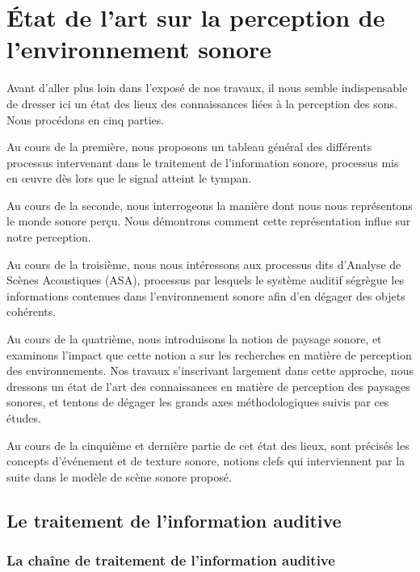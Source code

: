\chapter{État de l'art sur la perception de l'environnement sonore}\label{ch:psycho_ea}


Avant d'aller plus loin dans l'exposé de nos travaux, il nous semble indispensable de dresser ici un état des lieux des connaissances liées à la perception des sons. Nous procédons en cinq parties. 

Au cours de la première, nous proposons un tableau général des différents processus intervenant dans le traitement de l'information sonore, processus mis en œuvre dès lors que le signal atteint le tympan. 

Au cours de la seconde, nous interrogeons la manière dont nous nous représentons le monde sonore perçu. Nous démontrons comment cette représentation influe sur notre perception. 

Au cours de la troisième, nous nous intéressons aux processus dits d'Analyse de Scènes Acoustiques (ASA), processus par lesquels le système auditif ségrègue les informations contenues dans l'environnement sonore afin d'en dégager des objets cohérents. 

Au cours de la quatrième, nous introduisons la notion de paysage sonore, et examinons l'impact que cette notion a sur les recherches en matière de perception des environnements. Nos travaux s'inscrivant largement dans cette approche, nous dressons un état de l'art des connaissances en matière de perception des paysages sonores, et tentons de dégager les grands axes méthodologiques suivis par ces études.

Au cours de la cinquième et dernière partie de cet état des lieux, sont précisés les concepts d'événement et de texture sonore, notions clefs qui interviennent par la suite dans le modèle de scène sonore proposé.


\section{Le traitement de l'information auditive}

\subsection{La chaîne de traitement de l'information auditive}
\label{sec:chaineTaite}

